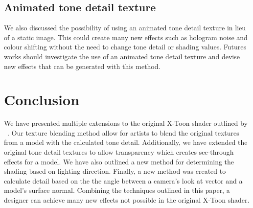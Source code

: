 \documentclass[annual]{acmsiggraph}
\begin{document}
\subsection{Animated tone detail texture}
We also discussed the possibility of using an animated tone detail texture in lieu of a static image. This could create many new effects such as hologram noise and colour shifting without the need to change tone detail or shading values. Futures works should investigate the use of an animated tone detail texture and devise new effects that can be generated with this method.

\section{Conclusion}
\label{sec:conclusion}
We have presented multiple extensions to the original X-Toon shader outlined by ~\cite{BTM06a}. Our texture blending method allow for artists to blend the original textures from a model with the calculated tone detail. Additionally, we have extended the original tone detail textures to allow transparency which creates see-through effects for a model. We have also outlined a new method for determining the shading based on lighting direction. Finally, a new method was created to calculate detail based on the the angle between a camera's look at vector and a model's surface normal. Combining the techniques outlined in this paper, a designer can achieve many new effects not possible in the original X-Toon shader.



\end{document}
